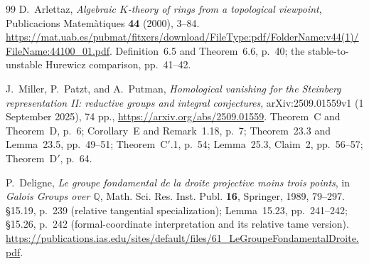 \documentclass[11pt,a4paper]{article}
\theoremstyle{definition}
\begin{document}
\begin{thebibliography}{99}
D.~Arlettaz,
\emph{Algebraic $K$-theory of rings from a topological viewpoint},
Publicacions Matem\`atiques \textbf{44} (2000), 3--84.
\url{https://mat.uab.es/pubmat/fitxers/download/FileType:pdf/FolderName:v44(1)/FileName:44100_01.pdf}.
Definition~6.5 and Theorem~6.6, p.~40;
the stable-to-unstable Hurewicz comparison, pp.~41--42.

J.~Miller, P.~Patzt, and A.~Putman,
\emph{Homological vanishing for the Steinberg representation II:
reductive groups and integral conjectures},
arXiv:2509.01559v1 (1 September 2025), 74 pp.,
\url{https://arxiv.org/abs/2509.01559}.
Theorem~C and Theorem~D, p.~6; Corollary~E and Remark~1.18,
p.~7; Theorem~23.3 and Lemma~23.5, pp.~49--51;
Theorem~C$'$.1, p.~54; Lemma~25.3, Claim~2, pp.~56--57;
Theorem~D$'$, p.~64.

P.~Deligne, \emph{Le groupe fondamental de la droite projective
moins trois points}, in \emph{Galois Groups over $\mathbb Q$},
Math. Sci. Res. Inst. Publ. \textbf{16}, Springer, 1989, 79--297.
\S15.19, p.~239 (relative tangential specialization);
Lemma~15.23, pp.~241--242; \S15.26, p.~242
(formal-coordinate interpretation and its relative tame version).
\url{https://publications.ias.edu/sites/default/files/61_LeGroupeFondamentalDroite.pdf}.

\end{thebibliography}
\end{document}
